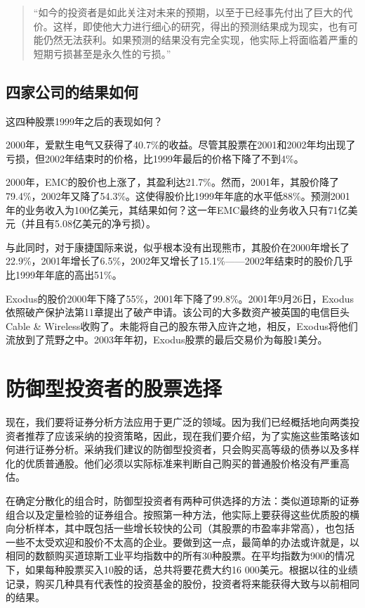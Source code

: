 \documentclass[12pt,oneside]{book}
\begin{document}
\begin{quote}
“如今的投资者是如此关注对未来的预期，以至于已经事先付出了巨大的代价。这样，即使他大力进行细心的研究，得出的预测结果成为现实，也有可能仍然无法获利。如果预测的结果没有完全实现，他实际上将面临着严重的短期亏损甚至是永久性的亏损。”
\end{quote}


\subsection{四家公司的结果如何}
这四种股票1999年之后的表现如何？

2000年，爱默生电气又获得了40.7\%的收益。尽管其股票在2001和2002年均出现了亏损，但2002年结束时的价格，比1999年最后的价格下降了不到4\%。

2000年，EMC的股价也上涨了，其盈利达21.7\%。然而，2001年，其股价降了79.4\%，2002年又降了54.3\%。这使得股价比1999年年底的水平低88\%。预测2001年的业务收入为100亿美元，其结果如何？这一年EMC最终的业务收入只有71亿美元（并且有5.08亿美元的净亏损）。

与此同时，对于康捷国际来说，似乎根本没有出现熊市，其股价在2000年增长了22.9\%，2001年增长了6.5\%，2002年又增长了15.1\%——2002年结束时的股价几乎比1999年年底的高出51\%。

Exodus的股价2000年下降了55\%，2001年下降了99.8\%。2001年9月26日，Exodus依照破产保护法第11章提出了破产申请。该公司的大多数资产被英国的电信巨头Cable \& Wireless收购了。未能将自己的股东带入应许之地，相反，Exodus将他们流放到了荒野之中。2003年年初，Exodus股票的最后交易价为每股1美分。


\section{防御型投资者的股票选择}
现在，我们要将证券分析方法应用于更广泛的领域。因为我们已经概括地向两类投资者推荐了应该采纳的投资策略，因此，现在我们要介绍，为了实施这些策略该如何进行证券分析。采纳我们建议的防御型投资者，只会购买高等级的债券以及多样化的优质普通股。他们必须以实际标准来判断自己购买的普通股价格没有严重高估。

在确定分散化的组合时，防御型投资者有两种可供选择的方法：类似道琼斯的证券组合以及定量检验的证券组合。按照第一种方法，他实际上要获得这些优质股的横向分析样本，其中既包括一些增长较快的公司（其股票的市盈率非常高），也包括一些不太受欢迎和股价不太高的企业。要做到这一点，最简单的办法或许就是，以相同的数额购买道琼斯工业平均指数中的所有30种股票。在平均指数为900的情况下，如果每种股票买入10股的话，总共将要花费大约16 000美元。根据以往的业绩记录，购买几种具有代表性的投资基金的股份，投资者将来能获得大致与以前相同的结果。
\end{document}
